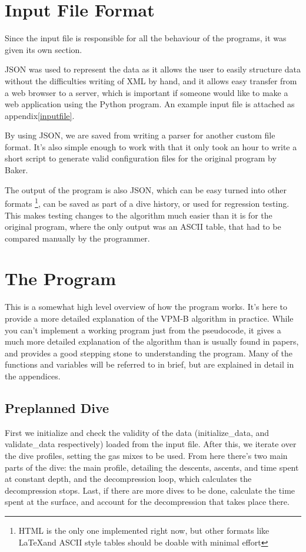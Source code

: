 \documentclass[12pt]{article}
\begin{document}
\section{Input File Format}

Since the input file is responsible for all the behaviour of the programs, it was given its own section.

JSON was used to represent the data as it allows the user to easily structure data without the difficulties writing of XML by hand, and it allows easy transfer from a web browser to a server, which is important if someone would like to make a web application
using the Python program. An example input file is attached as appendix\ref{inputfile}.

By using JSON, we are saved from writing a parser for another custom file format. It's also
simple enough to work with that it only took an hour to write a short script to generate valid
configuration files for the original program by Baker.

The output of the program is also JSON, which can be easy turned into other formats
\footnote{HTML is the only one implemented right now, but other formats like \LaTeX  and ASCII style tables should be doable with minimal effort},
 can be saved as part of a dive history, or used for regression testing. This makes testing changes to the algorithm
much easier than it is for the original program, where the only output was an ASCII table, that had to be compared
manually by the programmer.

\section{The Program}

This is a somewhat high level overview of how the program works. It's here to provide a more
detailed explanation of the VPM-B algorithm in practice. While you can't implement a working program
just from the pseudocode, it gives a much more detailed explanation of the algorithm than is usually
found in papers, and provides a good stepping stone to understanding the program. Many of the functions
and variables will be referred to in brief, but are explained in detail in the appendices.

\subsection{Preplanned Dive}

 First we initialize and check the validity of the data (initialize\_data, and validate\_data respectively) loaded from
the input file.
 After this, we iterate over the dive profiles, setting the gas mixes to be used. From here there's two main parts of the dive: the main profile, detailing the descents, ascents, and time spent at constant depth, and the decompression loop,
which calculates the decompression stops. Last, if there are more dives to be done, calculate the time spent at the
surface, and account for the decompression that takes place there.
\end{document}
